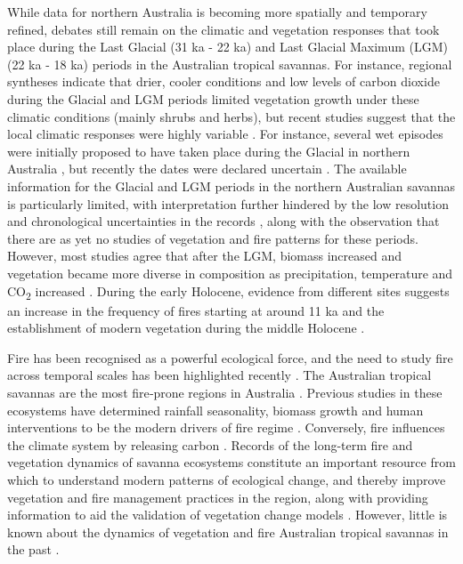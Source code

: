 \documentclass[
  12pt,
]{book}
\begin{document}
While data for northern Australia is becoming more spatially and temporary refined, debates still remain on the climatic and vegetation responses that took place during the Last Glacial (31 ka - 22 ka) and Last Glacial Maximum (LGM) (22 ka - 18 ka) periods in the Australian tropical savannas. For instance, regional syntheses indicate that drier, cooler conditions and low levels of carbon dioxide during the Glacial and LGM periods limited vegetation growth under these climatic conditions (mainly shrubs and herbs), but recent studies suggest that the local climatic responses were highly variable \citep{tierneyMolecularPerspectiveLate2010}. For instance, several wet episodes were initially proposed to have taken place during the Glacial in northern Australia \citep{nottPlungePoolsPaleoprecipitation1994, nott30000Year1996}, but recently the dates were declared uncertain \citep{mayRefiningLateQuaternary2015}. The available information for the Glacial and LGM periods in the northern Australian savannas is particularly limited, with interpretation further hindered by the low resolution and chronological uncertainties in the records \citep{marlonGlobalBiomassBurning2013}, along with the observation that there are as yet no studies of vegetation and fire patterns for these periods. However, most studies agree that after the LGM, biomass increased and vegetation became more diverse in composition as precipitation, temperature and CO\textsubscript{2} increased \citep{clarkGlobalClimateEvolution2012}. During the early Holocene, evidence from different sites suggests an increase in the frequency of fires starting at around 11 ka \citep{fieldCoherentPatternsEnvironmental2018} and the establishment of modern vegetation during the middle Holocene \citep{reevesPalaeoenvironmentalChangeTropical2013, haberle23000yrPollen2005, fieldCoherentPatternsEnvironmental2018, stevensonLateQuaternaryRecord2001}.

Fire has been recognised as a powerful ecological force, and the need to study fire across temporal scales has been highlighted recently \citep{mclauchlanFireFundamentalEcological2020}. The Australian tropical savannas are the most fire‐prone regions in Australia \citep{bowmanBiogeographyAustralianMonsoon2010, russell-smithAustralianSavannaFire2007, russell-smithSeasonalityFireSeverity2006}. Previous studies in these ecosystems have determined rainfall seasonality, biomass growth and human interventions to be the modern drivers of fire regime \citep{gillFireRegimesWorld2000, russell-smithLANDSATMSSDerivedFire1997}. Conversely, fire influences the climate system by releasing carbon \citep{bowmanFireEarthSystem2009}. Records of the long-term fire and vegetation dynamics of savanna ecosystems constitute an important resource from which to understand modern patterns of ecological change, and thereby improve vegetation and fire management practices in the region, along with providing information to aid the validation of vegetation change models \citep{powerChangesFireRegimes2008}. However, little is known about the dynamics of vegetation and fire Australian tropical savannas in the past \citep{reevesPalaeoenvironmentalChangeTropical2013}.
\end{document}
